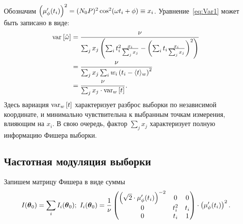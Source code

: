 Обозначим ${\bkt{\mupp}^2 = (N_0P)^2\cos^2(\w t_i + \phi) \equiv x_i}$. 
Уравнение~\eqref{eq:Var1} может быть записано в виде:
\begin{align}
\var{\hat\w} &= \frac{\nu}{\sum_j x_j \bkt{\sum_i t_i^2 \frac{x_i}{\sum_j x_j} - \bkt{\sum_i t_i \frac{x_i}{\sum_j x_j}}^2}} \notag\\
&= \frac{\nu}{\sum_j x_j \sum_i w_i\bkt{t_i - \avg{t}[w]}^2} \notag\\
&= \frac{\nu}{\sum_j x_j \cdot\var[w]{t}}. \label{eq:Var2}
\end{align}
Здесь вариация $\var[w]{t}$ характеризует разброс выборки по независимой координате, 
и минимально чувствительна к выбранным точкам измерения, влияющим на $x_i$. В свою очередь, 
фактор $\sum_jx_j$ характеризует полную информацию Фишера выборки. 


\subsection{Частотная модуляция выборки}
Запишем матрицу Фишера в виде суммы
\begin{equation}\label{eq:FisherSum}
\Fisher = \sum_i \Fisher[i]; 
~\Fisher[i] = \frac1\nu\begin{pmatrix}
\bkt{\sqrt2\cdot\mupp}^{-2} & 0 		& 0 \\
0		 & t_i^2 	& t_i \\
0		 &	t_i	    & 1
\end{pmatrix}\cdot\bkt{\mupp}^2.
\end{equation}

